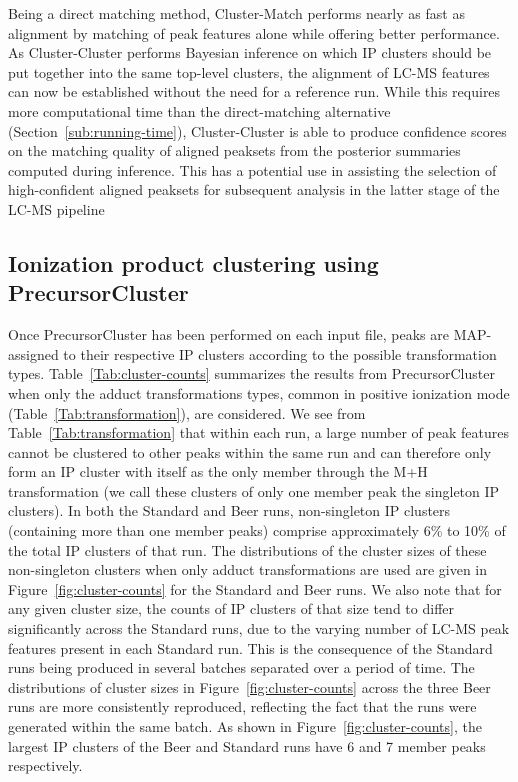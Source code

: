 Being a direct matching method, Cluster-Match performs nearly as fast as alignment by matching of peak features alone while offering better performance. As Cluster-Cluster performs Bayesian inference on which IP clusters should be put together into the same top-level clusters, the alignment of LC-MS features can now be established without the need for a reference run. While this requires more computational time than the direct-matching alternative (Section~\ref{sub:running-time}), Cluster-Cluster is able to produce confidence scores on the matching quality of aligned peaksets from the posterior summaries computed during inference. This has a potential use in assisting the selection of high-confident aligned peaksets for subsequent analysis in the latter stage of the LC-MS pipeline

\subsection{Ionization product clustering using PrecursorCluster}

Once PrecursorCluster has been performed on each input file, peaks are MAP-assigned to their respective IP clusters according to the possible transformation types. Table~\ref{Tab:cluster-counts} summarizes the results from PrecursorCluster when only the adduct transformations types, common in positive ionization mode (Table~\ref{Tab:transformation}), are considered. We see from Table~\ref{Tab:transformation} that within each run, a large number of peak features cannot be clustered to other peaks within the same run and can therefore only form an IP cluster with itself as the only member through the M+H transformation (we call these clusters of only one member peak the singleton IP clusters). In both the Standard and Beer runs, non-singleton IP clusters (containing more than one member peaks) comprise approximately 6\% to 10\% of the total IP clusters of that run. The distributions of the cluster sizes of these non-singleton clusters when only adduct transformations are used are given in Figure~\ref{fig:cluster-counts} for the Standard and Beer runs. We also note that for any given cluster size, the counts of IP clusters of that size tend to differ significantly across the Standard runs, due to the varying number of LC-MS peak features present in each Standard run. This is the consequence of the Standard runs being produced in several batches separated over a period of time. The distributions of cluster sizes in Figure~\ref{fig:cluster-counts} across the three Beer runs are more consistently reproduced, reflecting the fact that the runs were generated within the same batch. As shown in Figure~\ref{fig:cluster-counts}, the largest IP clusters of the Beer and Standard runs have 6 and 7 member peaks respectively. 

